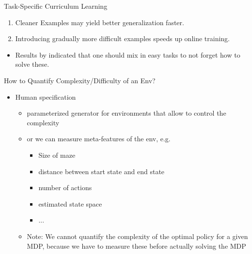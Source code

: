 \begin{frame}[c]{Task-Specific Curriculum Learning~}
	
	
	\begin{enumerate}
		\item Cleaner Examples may yield better generalization faster.
		\item Introducing gradually more difficult examples speeds up online training.
	\end{enumerate}

	\begin{itemize}
		\item Results by  indicated that one should mix in easy tasks to not forget how to solve these.
	\end{itemize}

	
\end{frame}
\begin{frame}[c]{How to Quantify Complexity/Difficulty of an Env?}
	
	\begin{itemize}
		\item Human specification
		\begin{itemize}
			\item parameterized generator for environments that allow to control the complexity 
			\item or we can measure meta-features of the env, e.g.
			\begin{itemize}
				\item Size of maze
				\item distance between start state and end state
				\item number of actions
				\item estimated state space
				\item ...
			\end{itemize}
			\item Note: We cannot quantify the complexity of the optimal policy for a given MDP, because we have to measure these before actually solving the MDP
		\end{itemize}
	\end{itemize}
	

\end{frame}

